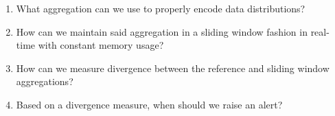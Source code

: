 \begin{enumerate}[label=\textbf{(RQ\arabic*)}]
    \item What aggregation can we use to properly encode data distributions?
    \item How can we maintain said aggregation in a sliding window fashion in real-time with constant memory usage?
    \item How can we measure divergence between the reference and sliding window aggregations?
    \item Based on a divergence measure, when should we raise an alert?
\end{enumerate}

